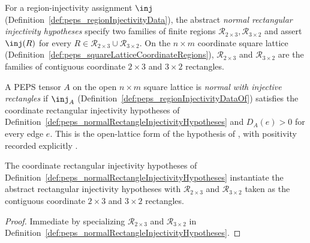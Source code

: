 \begin{definition}%
    \label{def:peps_normalRectangleInjectivityHypotheses}
    \leanok
    For a region-injectivity assignment $\inj$
    (Definition~\ref{def:peps_regionInjectivityData}), the abstract
    \emph{normal rectangular injectivity hypotheses} specify two families of
    finite regions $\mathcal R_{2\times 3},\mathcal R_{3\times 2}$ and assert
    $\inj(R)$ for every $R\in\mathcal R_{2\times 3}\cup\mathcal R_{3\times 2}$.
    On the $n\times m$ coordinate square lattice
    (Definition~\ref{def:peps_squareLatticeCoordinateRegions}),
    $\mathcal R_{2\times 3}$ and $\mathcal R_{3\times 2}$ are the families of
    contiguous coordinate $2\times 3$ and $3\times 2$ rectangles.
\end{definition}

\begin{definition}%
    \label{def:peps_normalSquareLatticeRectanglePEPS}
    \leanok
    A PEPS tensor $A$ on the open $n\times m$ square lattice is
    \emph{normal with injective rectangles} if $\inj_A$
    (Definition~\ref{def:peps_regionInjectivityDataOf}) satisfies the coordinate
    rectangular injectivity hypotheses of
    Definition~\ref{def:peps_normalRectangleInjectivityHypotheses} and
    $D_A(e)>0$ for every edge $e$. This is the open-lattice form of the
    hypothesis of \cite[Theorem~3]{Molnar2018NormalPEPS}, with positivity
    recorded explicitly \cite{gap:peps_injective_ft_section3_route}.
\end{definition}

\begin{lemma}%
    \label{lem:peps_squareLatticeRectangleInjectivity_toRectangular}
    \leanok
    The coordinate rectangular injectivity hypotheses of
    Definition~\ref{def:peps_normalRectangleInjectivityHypotheses} instantiate
    the abstract rectangular injectivity hypotheses with
    $\mathcal R_{2\times 3}$ and $\mathcal R_{3\times 2}$ taken as the
    contiguous coordinate $2\times 3$ and $3\times 2$ rectangles.
\end{lemma}
\begin{proof}\leanok
    Immediate by specializing $\mathcal R_{2\times 3}$ and
    $\mathcal R_{3\times 2}$ in
    Definition~\ref{def:peps_normalRectangleInjectivityHypotheses}.
\end{proof}

